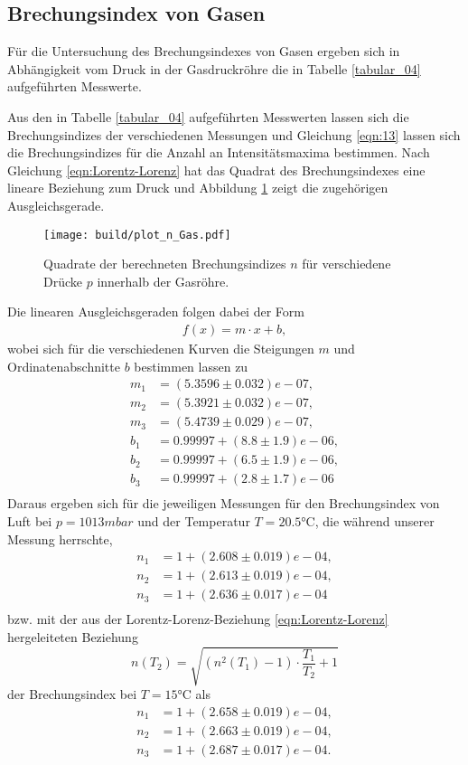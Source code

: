 \subsection{Brechungsindex von Gasen}
\noindent Für die Untersuchung des Brechungsindexes von Gasen ergeben sich in
Abhängigkeit vom Druck in der Gasdruckröhre die in Tabelle \ref{tabular_04}
aufgeführten Messwerte. \\
\FloatBarrier

\FloatBarrier
\noindent Aus den in Tabelle \ref{tabular_04} aufgeführten Messwerten lassen sich
die Brechungsindizes der verschiedenen Messungen und Gleichung \ref{eqn:13}
lassen sich die Brechungsindizes für die Anzahl an Intensitätsmaxima bestimmen.
Nach Gleichung \ref{eqn:Lorentz-Lorenz} hat das Quadrat des Brechungsindexes eine lineare Beziehung zum Druck
und Abbildung \ref{fig:03} zeigt die zugehörigen Ausgleichsgerade. \\
\FloatBarrier
\begin{figure}
  \centering
  \texttt{[image: build/plot\_n\_Gas.pdf]}
  \caption{Quadrate der berechneten Brechungsindizes $n$ für verschiedene Drücke
  $p$ innerhalb der Gasröhre.}
  \label{fig:03}
\end{figure}
\FloatBarrier
\noindent Die linearen Ausgleichsgeraden folgen dabei der Form
\begin{align}
  f(x) = m \cdot x + b,
\end{align}
wobei sich für die verschiedenen Kurven die Steigungen $m$ und Ordinatenabschnitte
$b$ bestimmen lassen zu
\begin{align*}
  m_1 &= (5.3596 \pm 0.032)e-07, \\
  m_2 &= (5.3921 \pm 0.032)e-07, \\
  m_3 &= (5.4739 \pm 0.029)e-07, \\
  b_1 &= 0.99997 + (8.8 \pm 1.9)e-06, \\
  b_2 &= 0.99997 + (6.5 \pm 1.9)e-06, \\
  b_3 &= 0.99997 + (2.8 \pm 1.7)e-06 \\
\end{align*}
%
%
%
%
\noindent Daraus ergeben sich für die jeweiligen Messungen für den Brechungsindex
von Luft bei $p = 1013\si{mbar}$ und der Temperatur $T = 20.5\si{\celsius}$, die während unserer Messung herrschte,
\begin{align}
  n_1 &= 1 + (2.608 \pm 0.019)e-04, \\
  n_2 &= 1 + (2.613 \pm 0.019)e-04, \\
  n_3 &= 1 + (2.636 \pm 0.017)e-04 \\
\end{align}
bzw. mit der aus der Lorentz-Lorenz-Beziehung \ref{eqn:Lorentz-Lorenz} hergeleiteten Beziehung
\begin{equation}
  n(T_2) = \sqrt{(n^2(T_1)-1)\cdot\frac{T_1}{T_2} + 1}
\end{equation}
der Brechungsindex bei $T = 15\si{\celsius}$ als
\begin{align}
  n_1 &= 1 + (2.658 \pm 0.019)e-04, \\
  n_2 &= 1 + (2.663 \pm 0.019)e-04, \\
  n_3 &= 1 + (2.687 \pm 0.017)e-04. \\
\end{align}